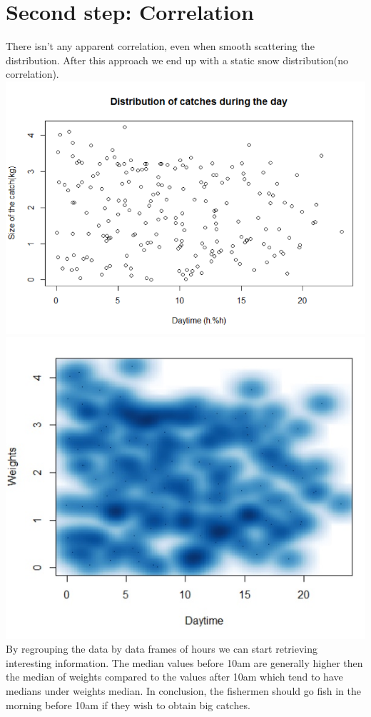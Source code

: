 \documentclass[12pt]{article} %
\begin{document}
\section{Second step: Correlation}
There isn't any apparent correlation, even when smooth scattering the distribution. After this approach we end up with a static snow distribution(no correlation).\\
\includegraphics[scale=.4]{raw_correlation}
\includegraphics[scale=.4]{smoothscatter_correlation}
By regrouping the data by data frames of hours we can start retrieving interesting information. The median values before 10am are generally higher then the median of weights compared to the values after 10am which tend to have medians under weights median. In conclusion, the fishermen should go fish in the morning before 10am if they wish to obtain big catches.\\
\end{document}
